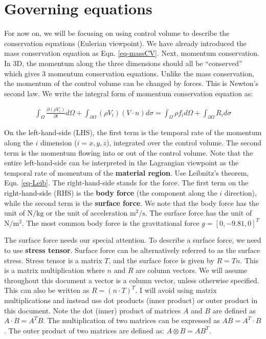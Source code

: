\documentclass[12pt, letterpaper]{report}
\begin{document}
\section{Governing equations}

For now on, we will be focusing on using control volume to describe the conservation equations
(Eulerian viewpoint). We have already introduced the mass conservation equation as Eqn.
\ref{eq-massCV}. Next, momentum conservation. In 3D, the momentum along the three dimensions should
all be ``conserved'' which gives 3 momentum conservation equations. Unlike the mass conservation,
the momentum of the control volume can be changed by forces. This is Newton's second law. We write
the integral form of momentum conservation equation as:


\begin{align}\label{eq-mom}
   \int_\Omega \frac{\partial(\rho V_i)}{\partial t}d\Omega + \int_{\partial\Omega}(\rho
   V_i)(V\cdot n)d\sigma = \int_\Omega \rho f_i d\Omega + \int_{\partial\Omega}R_i d\sigma
\end{align}

On the left-hand-side (LHS), the first term is the temporal rate of the momentum along the $i$ dimension
($i = x, y, z$), integrated over the control volume.  The second term is the momentum flowing into
or out of the control volume. Note that the entire left-hand-side can be interpreted in the
Lagrangian viewpoint as the temporal rate of momentum of the {\bf material region}. Use Leibnitz's
theorem, Eqn. \ref{eq-Leib}. The right-hand-side stands for the force. The first term on the
right-hand-side (RHS) is the {\bf body force} (the component along the $i$ direction), while the second
term is the {\bf surface force}. We note that the body force has the unit of $\textrm{N/kg}$ or the
unit of acceleration $\mathrm{m^2/s}$. The surface force has the unit of $\mathrm{N/m^2}$. The most
common body force is the gravitational force $g = [0, -9.81, 0]^T$
\paraspace

The surface force needs our special attention. To describe a surface force, we need to use {\bf
stress tensor}. Surface force can be alternatively referred to as the surface stress. Stress tensor
is a matrix $T$, and the surface force is given by $R = Tn$. This is a matrix multiplication where
$n$ and $R$ are column vectors. We will assume throughout this document a vector is a column vector,
unless otherwise specified. This can also be written as $R = (n\cdot T)^T$. I will avoid using
matrix multiplications and instead use dot products (inner product) or outer product in this
document. Note the dot (inner) product of matrices $A$ and $B$ are defined as $A \cdot B = A^T B$.
The multiplication of two matrices can be expressed as $AB = A^T \cdot B$. The outer product of two
matrices are defined as: $A\mathop{\otimes}B = AB^T$. \paraspace
\end{document}
